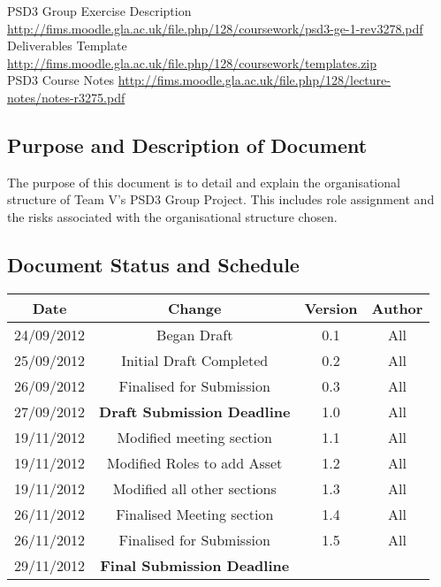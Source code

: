 \documentclass{l3deliverable}
\begin{document}
{{PSD3 Group Exercise Description \url{http://fims.moodle.gla.ac.uk/file.php/128/coursework/psd3-ge-1-rev3278.pdf}}\\

Deliverables Template \url{http://fims.moodle.gla.ac.uk/file.php/128/coursework/templates.zip}\\

PSD3 Course Notes \url{http://fims.moodle.gla.ac.uk/file.php/128/lecture-notes/notes-r3275.pdf}\\
 
\subsection{Purpose and Description of Document}

The purpose of this document is to detail and explain the organisational structure of Team V’s PSD3
Group Project. This includes role assignment and the risks associated with the organisational structure
chosen.

\subsection{Document Status and Schedule}

\begin{center}{
\begin{tabular}{|c|c|c|c|}
\hline \textbf{Date} &\textbf{Change} & \textbf{Version} & \textbf{Author}\\ 
\hline 24/09/2012 & Began Draft & 0.1 & All \\ 
\hline 25/09/2012 & Initial Draft Completed & 0.2 & All \\ 
\hline 26/09/2012 & Finalised for Submission & 0.3 & All\\ 
\hline 27/09/2012 & \textbf{Draft Submission Deadline} & 1.0 & All\\ 
\hline
\hline 19/11/2012 & Modified meeting section & 1.1 & All\\
\hline 19/11/2012 & Modified Roles to add Asset & 1.2 & All\\
\hline 19/11/2012 & Modified all other sections & 1.3 & All\\
\hline 26/11/2012 & Finalised Meeting section & 1.4 & All\\
\hline 26/11/2012 & Finalised for Submission & 1.5 & All\\
\hline 29/11/2012 & \textbf{Final Submission Deadline} &  & \\ 
\hline 
\end{tabular} }
\end{center}

}
\end{document}

